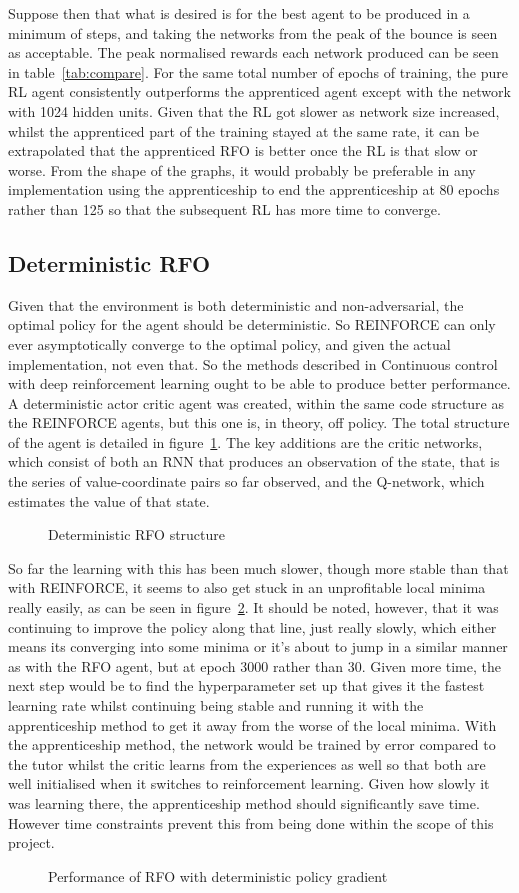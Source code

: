 Suppose then that what is desired is for the best agent to be produced in a minimum of steps, and taking the networks from the peak of the bounce is seen as acceptable. The peak normalised rewards each network produced can be seen in table~\ref{tab:compare}. For the same total number of epochs of training, the pure RL agent consistently outperforms the apprenticed agent except with the network with 1024 hidden units. Given that the RL got slower as network size increased, whilst the apprenticed part of the training stayed at the same rate, it can be extrapolated that the apprenticed RFO is better once the RL is that slow or worse. From the shape of the graphs, it would probably be preferable in any implementation using the apprenticeship to end the apprenticeship at 80 epochs rather than 125 so that the subsequent RL has more time to converge.

\subsection{Deterministic RFO}
\label{sec:detrfo}
Given that the environment is both deterministic and non-adversarial, the optimal policy for the agent should be deterministic. So REINFORCE can only ever asymptotically converge to the optimal policy, and given the actual implementation, not even that. So the methods described in Continuous control with deep reinforcement learning\cite{lillicrap2015continuous} ought to be able to produce better performance. A deterministic actor critic agent was created, within the same code structure as the REINFORCE agents, but this one is, in theory, off policy. The total structure of the agent is detailed in figure~\ref{fig:detrfo}. The key additions are the critic networks, which consist of both an RNN that produces an observation of the state, that is the series of value-coordinate pairs so far observed, and the Q-network, which estimates the value of that state.
\begin{figure}
\centering

\caption{Deterministic RFO structure}
\label{fig:detrfo}
\end{figure}

So far the learning with this has been much slower, though more stable than that with REINFORCE, it seems to also get stuck in an unprofitable local minima really easily, as can be seen in figure~\ref{fig:detpolgrad}. It should be noted, however, that it was continuing to improve the policy along that line, just really slowly, which either means its converging into some minima or it's about to jump in a similar manner as with the RFO agent, but at epoch 3000 rather than 30. Given more time, the next step would be to find the hyperparameter set up that gives it the fastest learning rate whilst continuing being stable and running it with the apprenticeship method to get it away from the worse of the local minima.  With the apprenticeship method, the network would be trained by error compared to the tutor whilst the critic learns from the experiences as well so that both are well initialised when it switches to reinforcement learning. Given how slowly it was learning there, the apprenticeship method should significantly save time. However time constraints prevent this from being done within the scope of this project.

\begin{figure}
\centering

\caption{Performance of RFO with deterministic policy gradient}
\label{fig:detpolgrad}
\end{figure}

